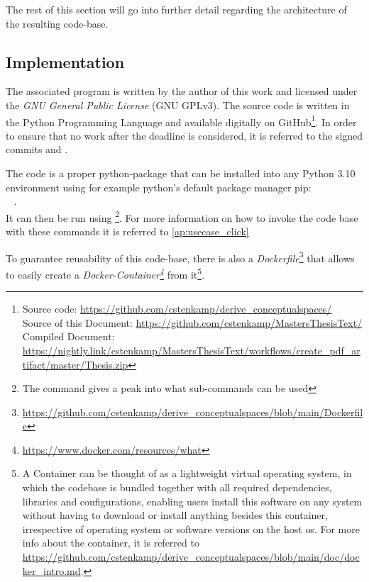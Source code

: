 The rest of this section will go into further detail regarding the architecture of the resulting code-base. 

\subsection{Implementation}

The associated program is written by the author of this work and licensed under the \emph{GNU General Public License} (GNU GPLv3). The source code is written in the Python Programming Language and available digitally on GitHub\footnote{Source code: \url{https://github.com/cstenkamp/derive_conceptualspaces/}\\Source of this Document: \url{https://github.com/cstenkamp/MastersThesisText/}\\Compiled Document: \url{https://nightly.link/cstenkamp/MastersThesisText/workflows/create_pdf_artifact/master/Thesis.zip}}. In order to ensure that no work after the deadline is considered, it is referred to the signed commits  and . 

The code is a proper python-package that can be installed into any Python 3.10 environment using for example python's default package manager pip:\\ ~ .\\ It can then be run using  \footnote{The command  gives a peak into what sub-commands can be used}. For more information on how to invoke the code base with these commands it is referred to \autoref{ap:usecase_click}

To guarantee reusability of this code-base, there is also a \emph{Dockerfile}\footnote{{\url{https://github.com/cstenkamp/derive_conceptualspaces/blob/main/Dockerfile}}} that allows to easily create a \emph{Docker-Container\footnote{\url{https://www.docker.com/resources/what}}} from it\footnote{A Container can be thought of as a lightweight virtual operating system, in which the codebase is bundled together with all required dependencies, libraries and configurations, enabling users install this software on any system without having to download or install anything besides this container, irrespective of operating system or software versions on the host \acrshort{os}. For more info about the container, it is referred to \url{https://github.com/cstenkamp/derive_conceptualspaces/blob/main/doc/docker_intro.md}.}.

